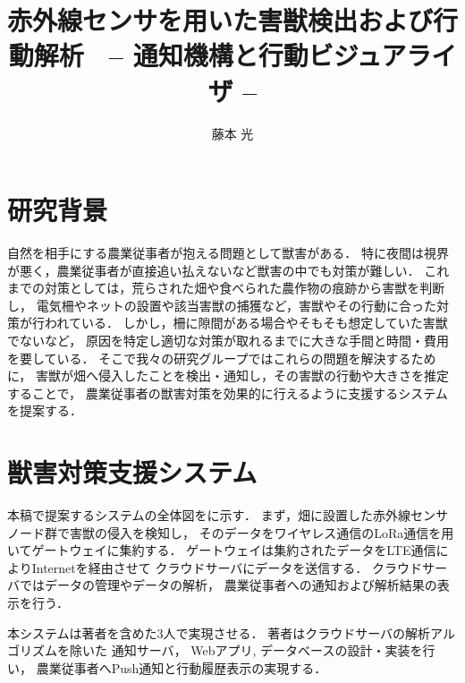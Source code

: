 \documentclass[twocolumn,platex,10pt]{yokou}
\title{赤外線センサを用いた害獣検出および行動解析{\large　-- 通知機構と行動ビジュアライザ --}}
\author{藤本 光}
\begin{document}
\maketitle

\section{研究背景}
自然を相手にする農業従事者が抱える問題として獣害がある．
特に夜間は視界が悪く，農業従事者が直接追い払えないなど獣害の中でも対策が難しい．
これまでの対策としては，荒らされた畑や食べられた農作物の痕跡から害獣を判断し，
電気柵やネットの設置や該当害獣の捕獲など，害獣やその行動に合った対策が行われている\cite{org:vermin-taisaku}．
しかし，柵に隙間がある場合やそもそも想定していた害獣でないなど，
原因を特定し適切な対策が取れるまでに大きな手間と時間・費用を要している．
そこで我々の研究グループではこれらの問題を解決するために，
害獣が畑へ侵入したことを検出・通知し，その害獣の行動や大きさを推定することで，
農業従事者の獣害対策を効果的に行えるように支援するシステムを提案する．

\section{獣害対策支援システム}
本稿で提案するシステムの全体図をに示す．
まず，畑に設置した赤外線センサノード群で害獣の侵入を検知し，
そのデータをワイヤレス通信のLoRa通信を用いてゲートウェイに集約する．
ゲートウェイは集約されたデータをLTE通信によりInternetを経由させて
クラウドサーバにデータを送信する．
クラウドサーバではデータの管理やデータの解析，
農業従事者への通知および解析結果の表示を行う．

本システムは著者を含めた3人で実現させる．
著者はクラウドサーバの解析アルゴリズムを除いた
通知サーバ，
Webアプリ,
データベースの設計・実装を行い，
農業従事者へPush通知と行動履歴表示の実現する．


\end{document}
